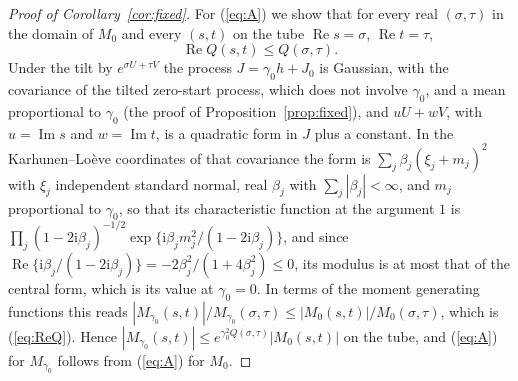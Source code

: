 \documentclass[ecta,nameyear,final]{econsocart}
\newcommand{\iu}{{\mathrm i}}
\newcommand{\Rea}{\operatorname{Re}}
\newcommand{\Ima}{\operatorname{Im}}
\theoremstyle{plain}
\theoremstyle{definition}
\begin{document}
\begin{appendix}
\begin{proof}[Proof of Corollary~\ref{cor:fixed}]
For (\ref{eq:A}) we show that for every real $(\sigma,\tau)$ in the domain of $M_0$ and every $(s,t)$ on the tube $\Rea s=\sigma$, $\Rea t=\tau$,
\begin{equation}
\Rea Q(s,t)\le Q(\sigma,\tau).
\label{eq:ReQ}
\end{equation}
Under the tilt by $e^{\sigma U+\tau V}$ the process $J=\gamma_0h+J_0$ is Gaussian, with the covariance of the tilted zero-start process, which does not involve $\gamma_0$, and a mean proportional to $\gamma_0$ (the proof of Proposition~\ref{prop:fixed}), and $uU+wV$, with $u=\Ima s$ and $w=\Ima t$, is a quadratic form in $J$ plus a constant.  In the Karhunen--Lo\`eve coordinates of that covariance the form is $\sum_j\beta_j(\xi_j+m_j)^2$ with $\xi_j$ independent standard normal, real $\beta_j$ with $\sum_j|\beta_j|<\infty$, and $m_j$ proportional to $\gamma_0$, so that its characteristic function at the argument $1$ is $\prod_j(1-2\iu\beta_j)^{-1/2}\exp\{\iu\beta_jm_j^2/(1-2\iu\beta_j)\}$, and since $\Rea\{\iu\beta_j/(1-2\iu\beta_j)\}=-2\beta_j^2/(1+4\beta_j^2)\le0$, its modulus is at most that of the central form, which is its value at $\gamma_0=0$.  In terms of the moment generating functions this reads $|M_{\gamma_0}(s,t)|/M_{\gamma_0}(\sigma,\tau)\le|M_0(s,t)|/M_0(\sigma,\tau)$, which is (\ref{eq:ReQ}).  Hence $|M_{\gamma_0}(s,t)|\le e^{\gamma_0^2Q(\sigma,\tau)}|M_0(s,t)|$ on the tube, and (\ref{eq:A}) for $M_{\gamma_0}$ follows from (\ref{eq:A}) for $M_0$.


\end{proof}
\end{appendix}
\end{document}
